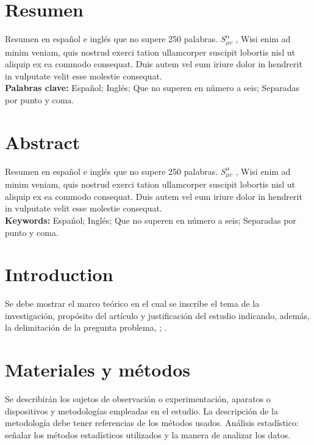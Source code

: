 \documentclass[9pt]{article}
\author[1,*]{\fontsize{9}{9} \textbf{Autor 1}}
\author[2]{\textbf{ Autor 2}}
\author[1,3]{\textbf{Autor 3}}
\affil[1]{\fontsize{8}{8}Filiación Autor 1, 8pt}
\affil[2]{Filiación Autor 2}
\affil[3]{Filiación Autor 3.}
\date{}                     %
\begin{document}
\maketitle
\section*{Resumen}
\justifying
Resumen en español e inglés que no supere 250 palabras. \lipsum[22] $S^{\alpha}_{\mu v}$ , Wisi enim ad minim veniam, quis nostrud
exerci tation ullamcorper suscipit lobortis nisl ut aliquip ex ea commodo consequat. Duis autem vel eum iriure dolor in hendrerit in vulputate velit esse molestie consequat.\\[0.2cm]
\textbf{Palabras clave:} Español; Inglés; Que no superen en número a seis; Separadas por punto y coma.


\section*{Abstract}

\justifying
Resumen en español e inglés que no supere 250 palabras. \lipsum[22]
$S^{\alpha}_{\mu v}$ , Wisi enim ad minim veniam, quis nostrud
exerci tation ullamcorper suscipit lobortis nisl ut aliquip ex ea commodo consequat. Duis autem vel eum iriure dolor in hendrerit in vulputate velit esse molestie consequat.\\[0.2cm]
\textbf{Keywords:} Español; Inglés; Que no superen en número a seis; Separadas por punto y coma.


\section*{Introduction}

Se debe mostrar el marco teórico en el cual se inscribe el tema de la investigación, propósito del artículo y justificación del estudio indicando, además, la delimitación de la pregunta
problema\cite{ostrogradski2007memoires}, \lipsum[20] \cite{woodard2007avoiding}; \lipsum[5] \cite{nicolis2009galileon}. 

\section*{Materiales y métodos}

Se describirán los sujetos de observación o experimentación, aparatos o dispositivos y metodologías empleadas en el estudio. La descripción de la metodología debe tener referencias de los métodos usados. Análisis estadístico: señalar los métodos estadísticos utilizados y la manera de analizar los datos.
\end{document}
